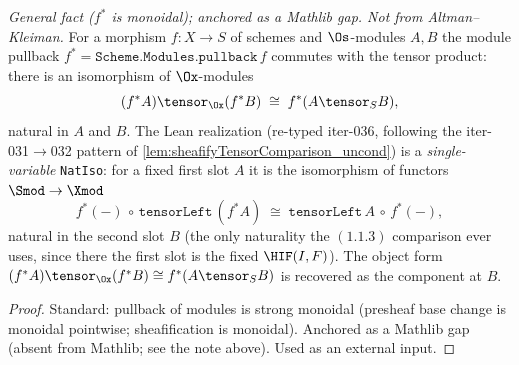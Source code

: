 \begin{lemma}
  \label{lem:pullbackTensorComparison}
  \textit{General fact ($f^*$ is monoidal); anchored as a Mathlib gap. Not from Altman--Kleiman.}
  For a morphism $f : X \to S$ of schemes and $\Os$-modules $A, B$ the module pullback
  $f^* = \texttt{Scheme.Modules.pullback}\,f$ commutes with the tensor product: there is an
  isomorphism of $\Ox$-modules
  \[
    (f^* A) \tensor_{\Ox} (f^* B) \;\cong\; f^*(A \tensor_S B),
  \]
  natural in $A$ and $B$. The Lean realization (re-typed iter-036, following the
  iter-031$\to$032 pattern of \cref{lem:sheafifyTensorComparison_uncond}) is a
  \emph{single-variable} \texttt{NatIso}: for a fixed first slot $A$ it is the isomorphism of
  functors $\Smod \to \Xmod$
  \[
    f^*(-) \,\circ\, \mathtt{tensorLeft}\,(f^* A) \;\cong\;
      \mathtt{tensorLeft}\,A \,\circ\, f^*(-),
  \]
  natural in the second slot $B$ (the only naturality the $(1.1.3)$ comparison ever uses, since
  there the first slot is the fixed $\HIF(I,F)$). The object form
  $(f^* A) \tensor_{\Ox} (f^* B) \cong f^*(A \tensor_S B)$ is recovered as the component at $B$.
  \begin{proof}
    Standard: pullback of modules is strong monoidal (presheaf base change is monoidal
    pointwise; sheafification is monoidal). Anchored as a Mathlib gap (absent from Mathlib;
    see the note above). Used as an external input.
  \end{proof}
\end{lemma}

